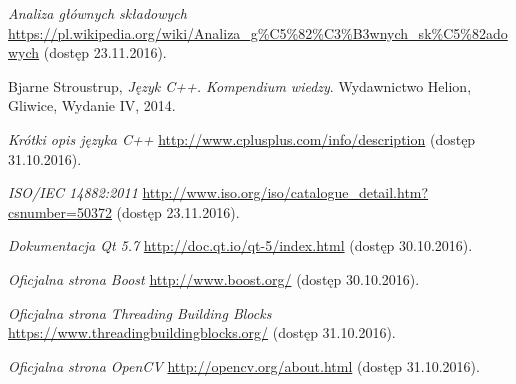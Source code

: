 \documentclass[a4paper,onecolumn,oneside,12pt,extrafontsizes]{memoir}
\begin{document}
\begin{thebibliography}{9}
	
	\emph{Analiza głównych składowych}
  \url{https://pl.wikipedia.org/wiki/Analiza\_g\%C5\%82\%C3\%B3wnych_sk\%C5\%82adowych}
  (dostęp 23.11.2016).
	
	Bjarne Stroustrup,
	\emph{Język C++. Kompendium wiedzy}.
	Wydawnictwo Helion, Gliwice,
	Wydanie IV,
	2014.
	
	\emph{Krótki opis języka C++}
	\url{http://www.cplusplus.com/info/description}
	(dostęp 31.10.2016).

	\emph{ISO/IEC 14882:2011}
	\url{http://www.iso.org/iso/catalogue_detail.htm?csnumber=50372}
	(dostęp 23.11.2016).
	
	\emph{Dokumentacja Qt 5.7}
	\url{http://doc.qt.io/qt-5/index.html}
	(dostęp 30.10.2016).
	
	\emph{Oficjalna strona Boost}
	\url{http://www.boost.org/}
	(dostęp 30.10.2016).
	
	\emph{Oficjalna strona Threading Building Blocks}
	\url{https://www.threadingbuildingblocks.org/}
	(dostęp 31.10.2016).
	
	\emph{Oficjalna strona OpenCV}
	\url{http://opencv.org/about.html}
	(dostęp 31.10.2016).
	
\end{thebibliography}
\end{document}
